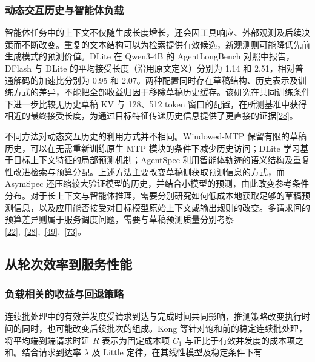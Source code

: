 \documentclass[11pt,a4paper,UTF8,fontset=none,scheme=plain,zihao=-4]{ctexart}
\begin{document}
\hypertarget{section-7-2-2}{%
\subsubsection{动态交互历史与智能体负载}\label{section-7-2-2}}

智能体任务中的上下文不仅随生成长度增长，还会因工具响应、外部观测及后续决策而不断改变。重复的文本结构可以为检索提供有效候选，新观测则可能降低先前生成模式的预测价值。DLite
在 Qwen3-4B 的 AgentLongBench 对照中报告，DFlash 与 DLite
的平均接受长度（沿用原文定义）分别为 1.14 和
2.51，相对普通解码的加速比分别为 0.95 和
2.07。两种配置同时存在草稿结构、历史表示及训练方式的差异，不能把全部收益归因于移除草稿历史缓存。该研究在共同训练条件下进一步比较无历史草稿
KV 与 128、512 token
窗口的配置，在所测基准中获得相近的最终接受长度，为通过目标特征传递历史信息提供了更直接的证据\protect\hyperlink{ref-dlite}{{[}28{]}}。

不同方法对动态交互历史的利用方式并不相同。Windowed-MTP
保留有限的草稿历史，可以在无需重新训练原生 MTP
模块的条件下减少历史访问；DLite
学习基于目标上下文特征的局部预测机制；AgentSpec
利用智能体轨迹的语义结构及重复性改进检索与预算分配。上述方法主要改变草稿侧获取预测信息的方式，而
AsymSpec
还压缩较大验证模型的历史，并结合小模型的预测，由此改变参考条件分布。对于长上下文与智能体推理，需要分别研究如何低成本地获取足够的草稿预测信息，以及应用能否接受对目标模型原始上下文或输出规则的改变。多请求间的预算差异则属于服务调度问题，需要与草稿预测质量分别考察\protect\hyperlink{ref-windowedmtp}{{[}22{]}},~\protect\hyperlink{ref-dlite}{{[}28{]}},~\protect\hyperlink{ref-agentspec}{{[}49{]}},~\protect\hyperlink{ref-asymspec}{{[}73{]}}。

\hypertarget{section-7-3}{%
\subsection{从轮次效率到服务性能}\label{section-7-3}}

\hypertarget{section-7-3-1}{%
\subsubsection{负载相关的收益与回退策略}\label{section-7-3-1}}

连续批处理中的有效并发度受请求到达与完成时间共同影响，推测策略改变执行时间的同时，也可能改变后续批次的组成。Kong
等针对饱和前的稳定连续批处理，将平均端到端请求时延 \(R\)
表示为固定成本项 \(C_1\) 与正比于有效并发度的成本项之和。结合请求到达率
\(\lambda\) 及 Little 定律，在其线性模型及稳定条件下有
\end{document}
